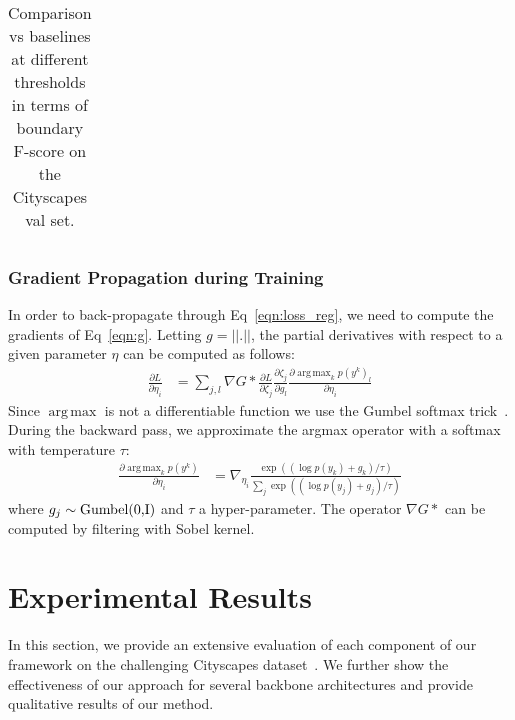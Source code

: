 \documentclass[10pt,twocolumn,letterpaper]{article}
\DeclareMathOperator*{\argmax}{arg\,max}
\begin{document}
\begin{table*}[t!]
{\begin{tabular}{c|l| c|c|c|c|c|c|c|c|c|c|c|c|c|c|c|c|c|c|c|c}
\end{tabular}
}
\vspace{-3mm}
\caption{ Comparison vs baselines at different thresholds in terms of boundary F-score  on the 
 Cityscapes val set. \label{cityscapes_sota_val_set_fscore}}
 \vspace{-2mm}
\end{table*}


\vspace{-2mm}
\subsubsection{Gradient Propagation during Training}
In order to back-propagate through Eq~\ref{eqn:loss_reg}, we need to compute the gradients of Eq~\ref{eqn:g}. Letting $g=||.||$, the partial derivatives with respect to a given parameter $\eta$ can be  computed as follows:
\begin{align}
\frac{\partial L}{\partial \eta_i}&=\sum_{j,l} \nabla G* \frac{\partial L}{\partial \zeta_j} \frac{\partial \zeta_j }{\partial g_l} \frac{  \partial \argmax_k p(y^{k})_l}{\partial \eta_i   }
\end{align}
Since $\argmax$ is not a differentiable function we use the Gumbel softmax trick~\cite{jang2016categorical}. 
During the backward pass, we approximate the argmax operator with a softmax with temperature $\tau $:
\begin{align}
\frac{ \partial \argmax_k p(y^{k})} {\partial \eta_i   }&=  \nabla_{\eta_i} \frac{ \exp((\log p(y_k) + g_k )/\tau)}{\sum_j \exp((\log p(y_j) + g_j )/\tau) }
\end{align}
where $g_j \sim \textnormal{Gumbel(0,I)} $ and $\tau$ a hyper-parameter. 
The operator $\nabla G *$ can be computed by filtering with Sobel kernel.
 
\vspace{-1mm}

\section{Experimental Results}

In this section, we provide an extensive evaluation of
each component of our framework on the challenging Cityscapes dataset~\cite{cityscapes}.
We further show the effectiveness of our approach for several backbone architectures and provide 
qualitative results of our method.

\iffalse
\begin{figure}[t!]
\vspace{-2mm}
\centering
\texttt{[image: images/crop.pdf]}
\vspace{-6mm}
\caption{Comparison of mIoU at different crop factors.}
\label{fig:crop}
\end{figure}
\fi
\end{document}
